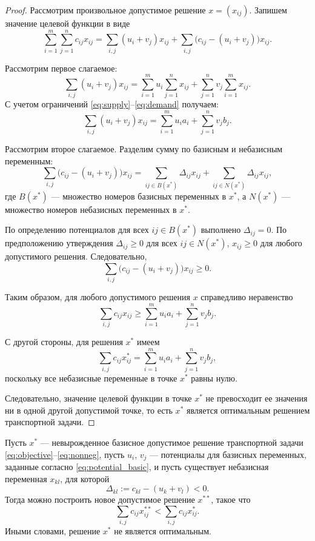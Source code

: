 \documentclass[12pt]{article}
\theoremstyle{definition}
\theoremstyle{plain}
\theoremstyle{definition}
\begin{document}
\begin{proof}
Рассмотрим произвольное допустимое решение $x = (x_{ij})$.
Запишем значение целевой функции в виде
\[
\sum_{i=1}^m \sum_{j=1}^n c_{ij} x_{ij}
=
\sum_{i,j} (u_i + v_j) x_{ij}
+
\sum_{i,j} \bigl(c_{ij} - (u_i + v_j)\bigr) x_{ij}.
\]

Рассмотрим первое слагаемое:
\[
\sum_{i,j} (u_i + v_j) x_{ij}
=
\sum_{i=1}^m u_i \sum_{j=1}^n x_{ij}
+
\sum_{j=1}^n v_j \sum_{i=1}^m x_{ij}.
\]
С учетом ограничений \eqref{eq:supply}–\eqref{eq:demand} получаем:
\[
\sum_{i,j} (u_i + v_j) x_{ij}
=
\sum_{i=1}^m u_i a_i + \sum_{j=1}^n v_j b_j.
\]

Рассмотрим второе слагаемое. Разделим сумму по базисным и небазисным переменным:
\[
\sum_{i,j} \bigl(c_{ij} - (u_i + v_j)\bigr) x_{ij}
=
\sum_{ij\in B(x^*)} \Delta_{ij} x_{ij}
+
\sum_{ij\in N(x^*)} \Delta_{ij} x_{ij},
\]
где $B(x^*)$ --- множество номеров базисных переменных в $x^*$,
а $N(x^*)$ --- множество номеров небазисных переменных в $x^*$.

По определению потенциалов для всех $ij\in B(x^*)$ выполнено $\Delta_{ij}=0$.
По предположению утверждения $\Delta_{ij}\ge 0$ для всех $ij\in N(x^*)$,
$x_{ij}\ge 0$ для любого допустимого решения.
Следовательно,
\[
\sum_{i,j} \bigl(c_{ij} - (u_i + v_j)\bigr) x_{ij} \ge 0.
\]

Таким образом, для любого допустимого решения $x$ справедливо неравенство
\[
\sum_{i,j} c_{ij} x_{ij}
\ge
\sum_{i=1}^m u_i a_i + \sum_{j=1}^n v_j b_j.
\]

С другой стороны, для решения $x^*$ имеем
\[
\sum_{i,j} c_{ij} x^*_{ij}
=
\sum_{i=1}^m u_i a_i + \sum_{j=1}^n v_j b_j,
\]
поскольку все небазисные переменные в точке $x^*$ равны нулю.

Следовательно, значение целевой функции в точке $x^*$
не превосходит ее значения ни в одной другой допустимой точке,
то есть $x^*$ является оптимальным решением транспортной задачи.
\end{proof}


\begin{assertionlocal}\label{assert:optimal}
Пусть $x^*$ --- невырожденное базисное допустимое решение транспортной задачи
\eqref{eq:objective}--\eqref{eq:nonneg},
пусть $u_i$, $v_j$ --- потенциалы для базисных переменных, заданные согласно
\ref{eq:potential_basic}, и пусть существует
небазисная переменная $x_{kl}$, для которой
\[
\Delta_{kl} := c_{kl} - (u_k + v_l) < 0.
\]
Тогда можно построить новое допустимое решение $x^{**}$, такое что
\[
\sum_{i,j} c_{ij} x^{**}_{ij} < \sum_{i,j} c_{ij} x^*_{ij}.
\]
Иными словами, решение $x^*$ не является оптимальным.
\end{assertionlocal}
\end{document}
